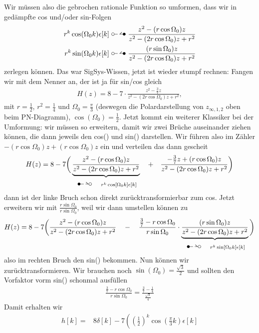 \begin{Loesung}
Wir müssen also die gebrochen rationale Funktion so umformen, dass wir in
gedämpfte cos und/oder sin-Folgen
\begin{align}
r^k \cos(\Omega_0 k)\epsilon[k] \ztransf \frac{z^2 -(r\cos\Omega_0)z}{z^2 -(2r\cos\Omega_0)z + r^2}\\
r^k \sin(\Omega_0 k)\epsilon[k] \ztransf \frac{(r\sin\Omega_0)z}{z^2 -(2r\cos\Omega_0)z + r^2}
\end{align}
zerlegen können. Das war SigSys-Wissen, jetzt ist wieder stumpf rechnen: Fangen
wir mit dem Nenner an, der ist ja für sin/cos gleich
\begin{align}
H(z) = 8 - 7\cdot\frac{z^2-\frac{3}{7}z}{z^2-(2r\cos\Omega_0)z +r^2},
\end{align}
mit $r = \frac{1}{2}$, $r^2=\frac{1}{4}$ und $\Omega_0 = \frac{\pi}{3}$ (deswegen
die Polardarstellung von $z_{\infty,1,2}$ oben beim PN-Diagramm),
$\cos(\Omega_0)=\frac{1}{2}$.
%
Jetzt kommt ein weiterer Klassiker bei der Umformung: wir müssen so erweitern,
damit wir zwei Brüche auseinander ziehen können, die dann jeweils den cos() und sin()
darstellen. Wir führen also im Zähler $-(r\cos\Omega_0)z + (r\cos\Omega_0)z$
ein und verteilen das dann gescheit
\begin{align}
H(z) = 8 -7\bigg(\underbrace{\frac{z^2-(r\cos\Omega_0)z}{z^2-(2r\cos\Omega_0)z +r^2}}_{\Ztransf \quad r^k \cos[\Omega_0 k]\epsilon[k]}
\quad + \quad \frac{-\frac{3}{7}z+(r\cos\Omega_0)z}{z^2-(2r\cos\Omega_0)z +r^2}\bigg)
\end{align}
dann ist der linke Bruch schon direkt zurücktransformierbar zum cos.
Jetzt erweitern wir mit $\frac{r\sin\Omega_0}{r\sin\Omega_0}$, weil wir dann
umstellen können zu
\begin{align}
H(z) = 8 -7\bigg(\frac{z^2-(r\cos\Omega_0)z}{z^2-(2r\cos\Omega_0)z +r^2}
\quad -\quad  \frac{\frac{3}{7}-r\cos\Omega_0}{r\sin\Omega_0}
\cdot \underbrace{\frac{(r\sin\Omega_0)z}{z^2-(2r\cos\Omega_0)z +r^2}}_{\Ztransf \quad r^k \sin[\Omega_0 k]\epsilon[k]}\bigg)
\end{align}
also im rechten Bruch den sin() bekommen.
Nun können wir zurücktransformieren. Wir brauchen noch $\sin(\Omega_0) = \frac{\sqrt{3}}{2}$
und sollten den Vorfaktor vorm sin() schonmal ausfüllen
\begin{align}
\frac{\frac{3}{7}-r\cos\Omega_0}{r\sin\Omega_0} = \frac{\frac{3}{7}-\frac{1}{4}}{\frac{\sqrt{3}}{4}}
\end{align}
Damit erhalten wir
\begin{align*}
h[k] =& 8\delta[k] -7\left(
\left(\frac{1}{2}\right)^k \cos(\frac{\pi}{3} k) \epsilon[k]

\end{align*}
\end{Loesung}
